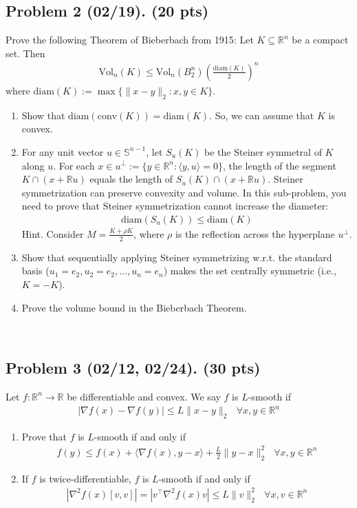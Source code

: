 \documentclass[12pt]{article}
\theoremstyle{plain}
\theoremstyle{definition}
\begin{document}
\subsection*{Problem 2 (02/19). (20 pts)}
Prove the following Theorem of Bieberbach from 1915: Let $K\subseteq \mathbb{R}^n$ be a compact set. Then
\begin{align*}
    \mathrm{Vol}_n(K)\leq \mathrm{Vol}_n(B_2^n)\left(\frac{\mathrm{diam}(K)}{2}\right)^n
\end{align*}
where $\mathrm{diam}(K):=\max\{\|x-y\|_2:x,y\in K\}$.\\
\begin{enumerate}
    \item Show that $\mathrm{diam}(\mathrm{conv}(K))=\mathrm{diam}(K)$. So, we can assume that $K$ is convex.
    \item For any unit vector $u\in \mathbb{S}^{n-1}$, let $S_u(K)$ be the Steiner symmetral of $K$ along $u$. For each $x\in u^\bot:=\{y\in \mathbb{R}^n:\langle y,u\rangle=0\}$, the length of the segment $K\cap (x+\mathbb{R}u)$ equals the length of $S_u(K)\cap (x+\mathbb{R}u)$. Steiner symmetrization can preserve convexity and volume. In this sub-problem, you need to prove that Steiner symmetrization cannot increase the diameter:
    \begin{align*}
        \mathrm{diam}(S_u(K))\leq \mathrm{diam}(K)
    \end{align*}
    Hint. Consider $M=\frac{K+\rho K}{2}$, where $\rho$ is the reflection across the hyperplane $u^\bot$.
    \item Show that sequentially applying Steiner symmetrizing w.r.t. the standard basis ($u_1=e_2,u_2=e_2,\dots,u_n=e_n$) makes the set centrally symmetric (i.e., $K=-K$).
    \item Prove the volume bound in the Bieberbach Theorem.
\end{enumerate}
 \newline
\   %
\newpage
\subsection*{Problem 3 (02/12, 02/24). (30 pts)}
Let $f:\mathbb{R}^n\rightarrow \mathbb{R}$ be differentiable and convex. We say $f$ is $L$-smooth if
\begin{align*}
    |\nabla f(x) -\nabla f(y)|\leq L\|x-y\|_2~~~\forall x,y\in \mathbb{R}^n
\end{align*}
\begin{enumerate}
    \item Prove that $f$ is $L$-smooth if and only if
    \begin{align*}
        f(y)\leq f(x)+\langle \nabla f(x),y-x\rangle +\frac{L}{2}\|y-x\|_2^2~~~\forall x,y\in \mathbb{R}^n        
    \end{align*}
    \item If $f$ is twice-differentiable, $f$ is $L$-smooth if and only if 
    \begin{align*}
        |\nabla^2f(x)[v,v]|=|v^\top \nabla^2f(x) v|\leq L\|v\|_2^2~~~\forall x,v\in \mathbb{R}^n
    \end{align*}
\end{enumerate}
\end{document}

